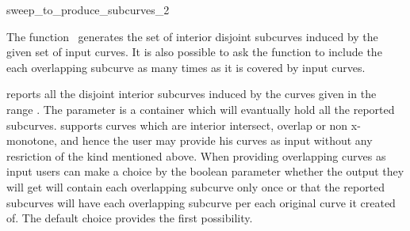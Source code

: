 

\begin{ccRefFunction}[CGAL::]{sweep_to_produce_subcurves_2}  %


\ccDefinition

The function \ccRefName\ generates the set of interior disjoint
subcurves induced by the given set of input curves. It is also
possible to ask the function to include the each overlapping subcurve
as many times as it is covered by input curves.

\def\ccLongParamLayout{\ccTrue} 

   {reports all the disjoint interior subcurves induced by the curves
   given in the range \ccStyle{[curves_begin, curves_end)}. The
   parameter  is a container which will evantually
   hold all the reported
   subcurves.  supports
   curves which are interior intersect, overlap or non x-monotone, and
   hence the user may provide his curves as input without any
   resriction of the kind mentioned above. When providing overlapping
   curves as input users can make a choice by the boolean parameter
    whether the output they will get will contain
   each overlapping subcurve only once or that the reported subcurves
   will have each overlapping subcurve per each original curve it
   created of. The default choice provides the first possibility.}

\ccSeeAlso

 \\


\end{ccRefFunction}
